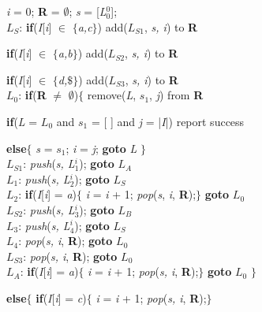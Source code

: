 \vspace{0.5cm}
\hspace{0.2cm}\textit{i} = 0; \textbf{R} = $\emptyset$; \textit{s} = [\textit{L$_0^{0}$}];\\
$L_S$: \textbf{if}(\textit{I}[\textit{i}] $\in$ $\{$\textit{a,c}$\}$) add($L_{S1}$, \textit{s, i}) to \textbf{R} \par
\hspace{0.2cm}\textbf{if}(\textit{I}[\textit{i}] $\in$ $\{$\textit{a,b}$\}$) add(\textit{$L_{S2}$}, \textit{s, i}) to \textbf{R}\par
\hspace{0.2cm}\textbf{if}(\textit{I}[\textit{i}] $\in$ $\{$\textit{d,$\$$}$\}$) add(\textit{$L_{S3}$}, \textit{s, i}) to \textbf{R} \\
$L_0$: \textbf{if}(\textbf{R} $\ne$ $\emptyset$)$\{$ remove(\textit{L}, $s_1$, \textit{j}) from \textbf{R} \par
\hspace{2.2cm}\textbf{if}(\textit{L} = $L_0$ and $s_1$ = [ ] and \textit{j} = |\textit{I}|) report success \par
\hspace{2.2cm}\textbf{else}$\{$ \textit{s} = $s_1$; \textit{i} = \textit{j}; \textbf{goto} \textit{L} $\}$ \\
$L_{S1}$: \textit{push}(\textit{s, L$_1^{i}$}); \textbf{goto} $L_A$\\
$L_1$:  \textit{push}(\textit{s, L$_2^{i}$}); \textbf{goto} $L_S$\\
$L_2$:  \textbf{if}(\textit{I}[\textit{i}] = \textit{a})$\{$ \textit{i} = \textit{i} + 1; \textit{pop}(\textit{s}, \textit{i}, \textbf{R});$\}$ \textbf{goto} $L_0$ \\
$L_{S2}$: \textit{push}(\textit{s, L$_3^{i}$}); \textbf{goto} $L_B$\\
$L_3$:  \textit{push}(\textit{s, L$_4^{i}$}); \textbf{goto} $L_S$\\
$L_4$: \textit{pop}(\textit{s, i}, \textbf{R}); \textbf{goto} $L_0$ \\
$L_{S3}$: \textit{pop}(\textit{s, i}, \textbf{R}); \textbf{goto} $L_0$ \\
$L_A$:  \textbf{if}(\textit{I}[\textit{i}] = \textit{a})$\{$ \textit{i} = \textit{i} + 1; \textit{pop}(\textit{s, i}, \textbf{R});$\}$ \textbf{goto} $L_0$ $\}$ \par
\hspace{0.2cm} \textbf{else}$\{$ \textbf{if}(\textit{I}[\textit{i}] = \textit{c})$\{$ \textit{i} = \textit{i} + 1; \textit{pop}(\textit{s, i}, \textbf{R});$\}$ \par 
